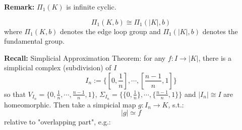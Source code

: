 \noindent\textbf{Remark:} $\Pi_1 (K)$ is infinite cyclic.

\begin{theorem}
    $$\Pi_1(K,b) \cong \Pi_1 (|K|,b)$$
    where $\Pi_1(K,b)$ denotes the edge loop group and $\Pi_1 (|K|,b)$ denotes the fundamental group.
\end{theorem}

\noindent\textbf{Recall:} Simplicial Approximation Theorem: for any $f :I \rightarrow |K|$, there is a simplicial complex (subdivision) of $I$
$$I_n := \{ [0, \frac{1}{n}] , \cdots, [\frac{n-1}{n},1]\}$$
so that $V_{I_n} = \{0, \frac{1}{n} ,\cdots, \frac{n-1}{n},1\}$, $ \Sigma  _{I_n} =\{ \{0, \frac{1}{n}\} , \cdots, \{\frac{n-1}{n},1\} \}$ and $|I_n| \cong I$ are homeomorphic. Then take a simpicial map $g: I_n \rightarrow K$, s.t.:
$$|g| \simeq f$$
relative to "overlapping part", e.g.:
